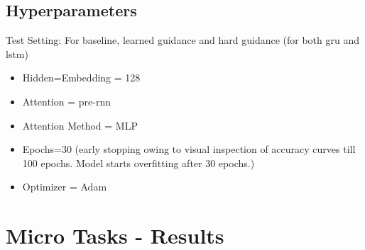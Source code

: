 \subsection{Hyperparameters}
Test Setting: For baseline, learned guidance and hard guidance (for both gru and lstm)
 \begin{itemize}
 	\item Hidden=Embedding = 128
 	\item Attention = pre-rnn
 	\item Attention Method = MLP
 	\item Epochs=30 (early stopping owing to visual inspection of accuracy curves till 100 epochs. Model starts overfitting after 30 epochs.)
 	\item Optimizer = Adam
 \end{itemize}
 
\section{Micro Tasks - Results}

